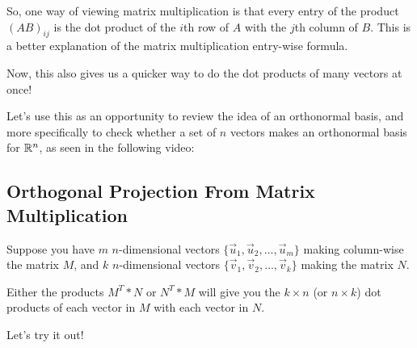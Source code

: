 \documentclass{ximera}
\begin{document}
So, one way of viewing matrix multiplication is that every entry of the product $(AB)_{ij}$ is the dot product of the $i$th row of $A$ with the $j$th column of $B$. This is a better explanation of the matrix multiplication entry-wise formula.

Now, this also gives us a quicker way to do the dot products of many vectors at once!

Let's use this as an opportunity to review the idea of an orthonormal basis, and more specifically to check whether a set of $n$ vectors makes an orthonormal basis for $\mathbb{R}^n$, as seen in the following video:

\begin{center}
\end{center}

\subsection*{Orthogonal Projection From Matrix Multiplication}

Suppose you have $m$ $n$-dimensional vectors $\lbrace \vec{u}_1, \vec{u}_2, \ldots, \vec{u}_m\rbrace$ making column-wise the matrix $M$, and $k$ $n$-dimensional vectors $\lbrace \vec{v}_1, \vec{v}_2, \ldots, \vec{v}_k\rbrace$ making the matrix $N$. 

Either the products $M^T*N$ or $N^T*M$ will give you the $k\times n$ (or $n\times k$) dot products of each vector in $M$ with each vector in $N$.

Let's try it out!
\end{document}
